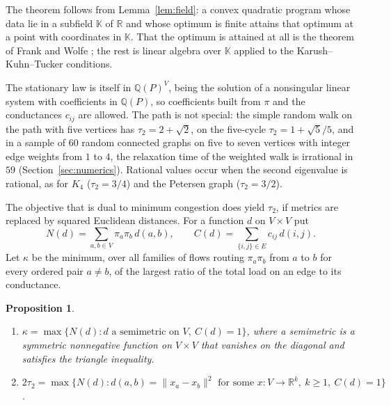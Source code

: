 \documentclass[11pt]{amsart}
\newtheorem{proposition}[theorem]{Proposition}
\theoremstyle{remark}
\numberwithin{equation}{section}
\newcommand{\Q}{\mathbb Q}
\newcommand{\R}{\mathbb R}
\newcommand{\K}{\mathbb K}
\begin{document}
The theorem follows from Lemma~\ref{lem:field}: a convex quadratic program whose data lie in a subfield $\K$ of $\R$ and whose optimum is finite attains that optimum at a point with coordinates in $\K$. That the optimum is attained at all is the theorem of Frank and Wolfe \cite{FW}; the rest is linear algebra over $\K$ applied to the Karush--Kuhn--Tucker conditions.

The stationary law is itself in $\Q(P)^V$, being the solution of a nonsingular linear system with coefficients in $\Q(P)$, so coefficients built from $\pi$ and the conductances $c_{ij}$ are allowed. The path is not special: the simple random walk on the path with five vertices has $\tau_2=2+\sqrt2$, on the five-cycle $\tau_2=1+\sqrt5/5$, and in a sample of $60$ random connected graphs on five to seven vertices with integer edge weights from $1$ to $4$, the relaxation time of the weighted walk is irrational in $59$ (Section~\ref{sec:numerics}). Rational values occur when the second eigenvalue is rational, as for $K_4$ ($\tau_2=3/4$) and the Petersen graph ($\tau_2=3/2$).

The objective that is dual to minimum congestion does yield $\tau_2$, if metrics are replaced by squared Euclidean distances. For a function $d$ on $V\times V$ put
\[
N(d)=\sum_{a,b\in V}\pi_a\pi_b\,d(a,b),\qquad C(d)=\sum_{\{i,j\}\in E}c_{ij}\,d(i,j).
\]
Let $\kappa$ be the minimum, over all families of flows routing $\pi_a\pi_b$ from $a$ to $b$ for every ordered pair $a\ne b$, of the largest ratio of the total load on an edge to its conductance.

\begin{proposition}\label{prop:cones}
\begin{enumerate}[label=\textup{(\roman*)}]
\item $\kappa=\max\{N(d): d \text{ a semimetric on } V,\ C(d)=1\}$, where a semimetric is a symmetric nonnegative function on $V\times V$ that vanishes on the diagonal and satisfies the triangle inequality.
\item $2\tau_2=\max\{N(d): d(a,b)=\|x_a-x_b\|^2 \text{ for some } x\colon V\to\R^k,\ k\ge1,\ C(d)=1\}$.
\end{enumerate}
\end{proposition}
\end{document}
